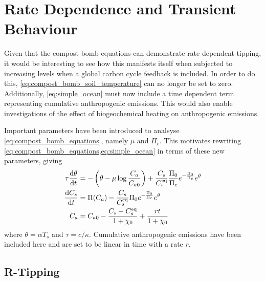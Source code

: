 \section{Rate Dependence and Transient Behaviour}
Given that the compost bomb equations can demonstrate rate dependent tipping, it would be interesting to see how this manifests itself when subjected to increasing  levels
when a global carbon cycle feedback is included. In order to do this, \cref{eq:compost_bomb_soil_temperature} can no longer be set to zero. Additionally, \cref{eq:simple_ocean}
must now include a time dependent term representing cumulative anthropogenic emissions. This would also enable investigations of the effect of biogeochemical heating on anthropogenic emissions.

Important parameters have been introduced to analsyse \cref{eq:compost_bomb_equations}, namely $\mu$ and $\Pi_c$. This motivates rewriting \cref{eq:compost_bomb_equations,eq:simple_ocean}
in terms of these new parameters, giving
\begin{subequations}
  \label{eq:compost_bomb_equations_scaled}
  \begin{align}
    \tau\dv{\theta}{t} &= -\left(\theta - \mu \log \frac{C_a}{C_{a0}}\right) + \frac{C_s}{C_s^{\mathrm{eq}}} \frac{\Pi_0}{\Pi_c} e^{-\frac{\Pi_0}{\Pi_c}} e^{\theta} \\
    \dv{C_s}{t}      &= \Pi(C_a) - \frac{C_s}{C_s^{\mathrm{eq}}} \Pi_0 e^{-\frac{\Pi_0}{\Pi_c}} e^{\theta} \\
    C_a           &= C_{a0} - \frac{C_s - C_s^{\mathrm{eq}}}{1+\chi_0} + \frac{rt}{1+\chi_0}
  \end{align}
\end{subequations}
where $\theta = \alpha T_s$ and $\tau = c/\kappa$. Cumulative anthropogenic emissions have been included here and are set to be linear in time with a rate $r$.

\subsection{R-Tipping}

